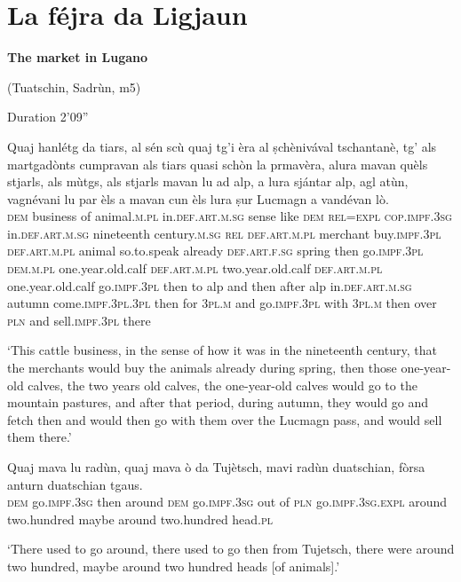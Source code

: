 \section{La féjra da Ligjaun} 
\textbf{The market in Lugano}


(Tuatschin, Sadrùn, m5)


Duration 2'09''
\bigskip

\begin{linenumbers}
\gll Quaj hanlétg da tiars, al sén scù quaj tg'i èra al ṣchènivával tschantanè, tg' als martgadònts cumpravan als tiars quasi schòn la prmavèra, alura mavan quèls stjarls, als mùtgs, als stjarls mavan lu ad alp, a lura sjántar alp, agl atùn, vagnévani lu par èls a mavan cun èls lura ṣur Lucmagn a vandévan lò.\\
\textsc{dem} business of animal.\textsc{m.pl} in.\textsc{def.art.m.sg} sense like \textsc{dem} \textsc{rel=expl} \textsc{cop.impf.3sg} in.\textsc{def.art.m.sg} nineteenth century.\textsc{m.sg} \textsc{rel} \textsc{def.art.m.pl} merchant buy.\textsc{impf.3pl} \textsc{def.art.m.pl} animal so.to.speak already \textsc{def.art.f.sg} spring then go.\textsc{impf.3pl} \textsc{dem.m.pl} one.year.old.calf \textsc{def.art.m.pl} two.year.old.calf \textsc{def.art.m.pl} one.year.old.calf go.\textsc{impf.3pl} then to alp and then after alp in.\textsc{def.art.m.sg} autumn come.\textsc{impf.3pl.3pl} then for \textsc{3pl.m} and go.\textsc{impf.3pl} with \textsc{3pl.m} then over \textsc{pln} and sell.\textsc{impf.3pl} there\\
\end{linenumbers}
\medskip
\glt`This cattle business, in the sense of how it was in the nineteenth century, that the merchants would buy the animals already during spring, then those one-year-old calves, the two years old calves, the one-year-old calves would go to the mountain pastures, and after that period, during autumn, they would go and fetch then and would then go with them over the Lucmagn pass, and would sell them there.'
\medskip

\begin{linenumbers}
\gll Quaj mava lu radùn, quaj mava ò da Tujètsch, mavi radùn duatschian, fòrsa anturn duatschian tgaus.\\
  \textsc{dem} go.\textsc{impf.3sg} then around \textsc{dem} go.\textsc{impf.3sg} out of \textsc{pln}  go.\textsc{impf.3sg.expl} around two.hundred maybe around two.hundred head.\textsc{pl}\\
\end{linenumbers}
\medskip
\glt `There used to go around, there used to go then from Tujetsch, there were around two hundred, maybe around two hundred heads [of animals].'
\medskip

